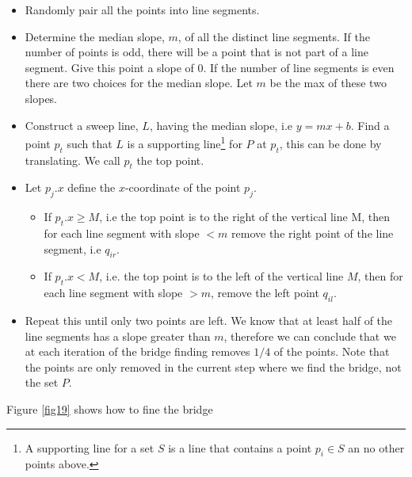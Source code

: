 \documentclass[10pt]{article}
\begin{document}
\begin{itemize}
  \item Randomly pair all the points into line segments.
  \item Determine the median slope, $m$, of all the distinct line segments. If the number of points is odd, there will be a point that is not part of a line segment. Give this point a slope of $0$. If the number of line segments is even there are two choices for the median slope. Let $m$ be the max of these two slopes.
  \item Construct a sweep line, $L$, having the median slope, i.e $y = mx+b$. Find a point $p_t$ such that $L$ is a supporting line\footnote{A supporting line for a set $S$ is a line that contains a point $p_i \in S$ an no other points above.} for $P$ at $p_t$, this can be done by translating. We call $p_t$ the top point. 
  \item Let $p_j.x$ define the $x$-coordinate of the point $p_j$. 
  \begin{itemize}
    \item If $p_t.x \geq M$, i.e the top point is to the right of the vertical line M, then for each line segment with slope $< m$ remove the right point of the line segment, i.e $q_{ir}$.
    \item If $p_t.x < M$, i.e. the top point is to the left of the vertical line $M$, then for each line segment with slope $>m$, remove the left point $q_{il}$.
  \end{itemize}
  \item Repeat this until only two points are left. We know that at least half of the line segments has a slope greater than $m$, therefore we can conclude that we at each iteration of the bridge finding removes $1/4$ of the points. Note that the points are only removed in the current step where we find the bridge, not the set $P$.
\end{itemize}

Figure \ref{fig19} shows how to fine the bridge
\end{document}
